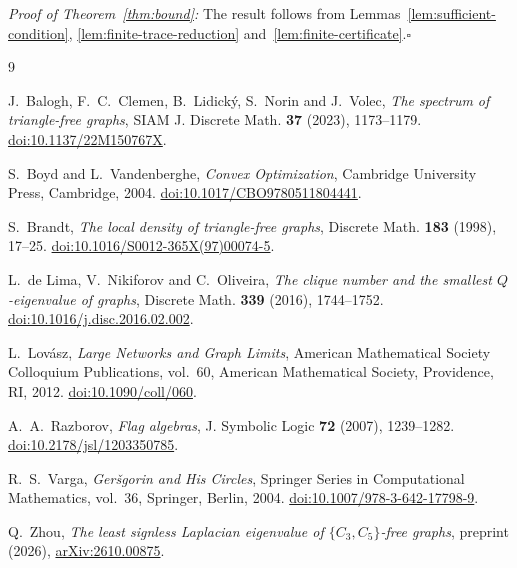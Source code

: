 \documentclass[11pt]{article}
\begin{document}
\noindent\emph{Proof of Theorem~\ref{thm:bound}:}
The result follows from Lemmas~\ref{lem:sufficient-condition},
\ref{lem:finite-trace-reduction} and~\ref{lem:finite-certificate}.\hfill$\square$


\begin{thebibliography}{9}
\raggedright
{}
J.~Balogh, F.~C.~Clemen, B.~Lidick\'y, S.~Norin and J.~Volec,
\emph{The spectrum of triangle-free graphs},
SIAM J. Discrete Math. \textbf{37} (2023), 1173--1179.
\href{https://doi.org/10.1137/22M150767X}{doi:10.1137/22M150767X}.

S.~Boyd and L.~Vandenberghe, \emph{Convex Optimization},
Cambridge University Press, Cambridge, 2004.
\href{https://doi.org/10.1017/CBO9780511804441}{doi:10.1017/CBO9780511804441}.

S.~Brandt, \emph{The local density of triangle-free graphs},
Discrete Math. \textbf{183} (1998), 17--25.
\href{https://doi.org/10.1016/S0012-365X(97)00074-5}{doi:10.1016/S0012-365X(97)00074-5}.

L.~de Lima, V.~Nikiforov and C.~Oliveira,
\emph{The clique number and the smallest $Q$-eigenvalue of graphs},
Discrete Math. \textbf{339} (2016), 1744--1752.
\href{https://doi.org/10.1016/j.disc.2016.02.002}{doi:10.1016/j.disc.2016.02.002}.

L.~Lov\'asz, \emph{Large Networks and Graph Limits},
American Mathematical Society Colloquium Publications, vol.~60,
American Mathematical Society, Providence, RI, 2012.
\href{https://doi.org/10.1090/coll/060}{doi:10.1090/coll/060}.

A.~A.~Razborov, \emph{Flag algebras},
J. Symbolic Logic \textbf{72} (2007), 1239--1282.
\href{https://doi.org/10.2178/jsl/1203350785}{doi:10.2178/jsl/1203350785}.

R.~S.~Varga, \emph{Ger\v{s}gorin and His Circles},
Springer Series in Computational Mathematics, vol.~36,
Springer, Berlin, 2004.
\href{https://doi.org/10.1007/978-3-642-17798-9}{doi:10.1007/978-3-642-17798-9}.

Q.~Zhou, \emph{The least signless Laplacian eigenvalue of
$\{C_3,C_5\}$-free graphs}, preprint (2026),
\href{https://arxiv.org/abs/2610.00875}{arXiv:2610.00875}.
\end{thebibliography}
\end{document}
